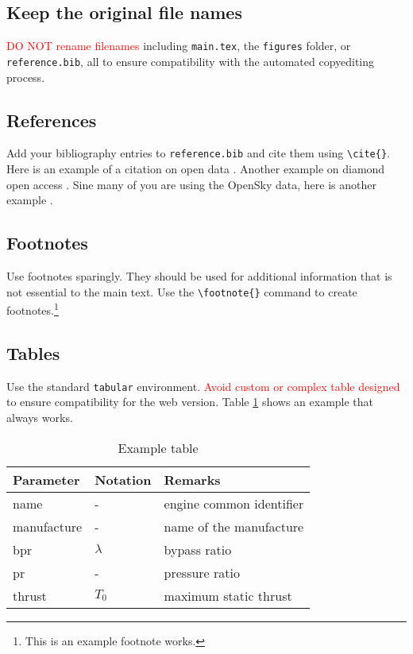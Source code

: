 \documentclass[
  manuscript=article,  %
  layout=preprint,  %
  year=20xx,
  volume=x,
]{extra/joas}
\begin{document}
\subsection{Keep the original file names}
\textcolor{red}{DO NOT rename filenames} including \texttt{main.tex}, the \texttt{figures} folder, or \texttt{reference.bib}, all to ensure compatibility with the automated copyediting process.

\subsection{References}
Add your bibliography entries to \texttt{reference.bib} and cite them using \verb|\cite{}|. Here is an example of a citation on open data \cite{murray2008open}. Another example on diamond open access \cite{fuchs2013diamond}. Sine many of you are using the OpenSky data, here is another example \cite{schafer2014bringing}.

\subsection{Footnotes}
Use footnotes sparingly. They should be used for additional information that is not essential to the main text. Use the \verb|\footnote{}| command to create footnotes.\footnote{This is an example footnote works.}

\subsection{Tables}
Use the standard \texttt{tabular} environment. \textcolor{red}{Avoid custom or complex table designed} to ensure compatibility for the web version. Table \ref{tb:example_table} shows an example that always works.

\begin{table}[htbp!]
  \centering
  \small
  \caption{Example table}
  \label{tb:example_table}
  \begin{tabular}{lll}
  \toprule
  \textbf{Parameter} & \textbf{Notation} & \textbf{Remarks} \\
  \midrule
  name & - & engine common identifier \\
  manufacture & - & name of the manufacture  \\
  bpr & $\lambda$ & bypass ratio \\
  pr & - & pressure ratio \\
  thrust & $T_0$ & maximum static thrust\\
  \bottomrule
  \end{tabular}
\end{table}
\end{document}
